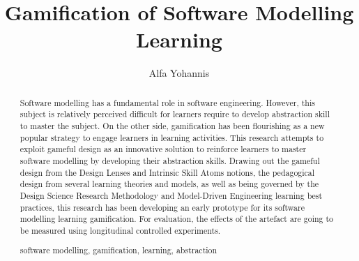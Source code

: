 \documentclass[runningheads,a4paper]{llncs}
\newcommand{\keywords}[1]{\par\addvspace\baselineskip
\noindent\keywordname\enspace\ignorespaces#1}
\begin{document}
\mainmatter  %

\title{Gamification of Software Modelling Learning}


%
%
\author{Alfa Yohannis}
%


%
%

\maketitle


\begin{abstract}
Software modelling has a fundamental role in software engineering. However, this subject is relatively perceived difficult for learners require to develop abstraction skill to master the subject. On the other side, gamification has been flourishing as a new popular strategy to engage learners in learning activities. This research attempts to exploit gameful design as an innovative solution to reinforce learners to master software modelling by developing their abstraction skills. Drawing out the gameful design from the Design Lenses and Intrinsic Skill Atoms notions, the pedagogical design from several learning theories and models, as well as being governed by the Design Science Research Methodology and Model-Driven Engineering learning best practices, this research has been developing an early prototype for its software modelling learning gamification. For evaluation, the effects of the artefact are going to be measured using longitudinal controlled experiments.
\keywords{software modelling, gamification, learning, abstraction}
\end{abstract}
\end{document}
